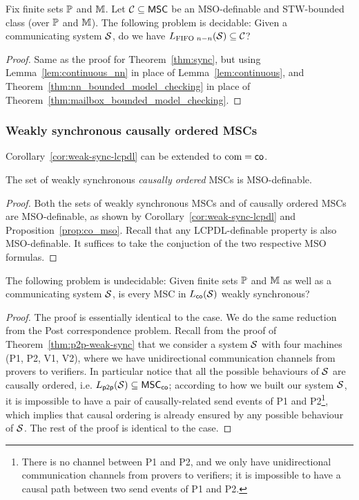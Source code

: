 \begin{theorem}\label{thm:sync_nn}
	Fix finite sets $\mathbb{P}$ and $\mathbb{M}$.
	Let $\mathcal{C} \subseteq \mathsf{MSC}$ be an MSO-definable and STW-bounded class (over $\mathbb{P}$ and $\mathbb{M}$).
	The following problem is decidable:
	Given a communicating system $\mathcal{S}$, do we have $L_{\text{FIFO } n\mathsf{-}n}(\mathcal{S}) \subseteq \mathcal{C}$?
	\end{theorem}
\begin{proof}
Same as the proof for Theorem~\ref{thm:sync}, but using Lemma~\ref{lem:continuous_nn} in place of Lemma~\ref{lem:continuous}, and Theorem~\ref{thm:nn_bounded_model_checking} in place of Theorem~\ref{thm:mailbox_bounded_model_checking}.
\end{proof}

\subsubsection{Weakly synchronous causally ordered MSCs}

Corollary~\ref{cor:weak-sync-lcpdl} can  be extended to $\textup{com} = \mathsf{co}$. 

\begin{proposition}\label{cor:co-weak-sync-mso}
The set of weakly synchronous \emph{causally ordered} MSCs is MSO-definable.
\end{proposition}
\begin{proof}
Both the sets of weakly synchronous MSCs and of causally ordered MSCs are MSO-definable, as shown by Corollary~\ref{cor:weak-sync-lcpdl} and Proposition~\ref{prop:co_mso}. Recall that any LCPDL-definable property is also MSO-definable. It suffices to take the conjuction of the two respective MSO formulas.
\end{proof}

\begin{theorem}\label{thm:co-weak-sync}
The following problem is undecidable:
Given finite sets $\mathbb{P}$ and $\mathbb{M}$ as well as a communicating system $\mathcal{S}$,
is every MSC in $L_{\mathsf{co}}(\mathcal{S})$ weakly synchronous?
\end{theorem}
\begin{proof}
The proof is essentially identical to the \pp case. We do the same reduction from the Post correspondence problem. Recall from the proof of Theorem~\ref{thm:p2p-weak-sync} that we consider a system $\mathcal{S}$ with four machines (P1, P2, V1, V2), where we have unidirectional communication channels from provers to verifiers. In particular notice that all the possible behaviours of $\mathcal{S}$ are causally ordered, i.e. $L_{\mathsf{p2p}}(\mathcal{S}) \subseteq \mathsf{MSC}_{\mathsf{co}}$; according to how we built our system $\mathcal{S}$, it is impossible to have a pair of causally-related send events of P1 and P2\footnote{There is no channel between P1 and P2, and we only have unidirectional communication channels from provers to verifiers; it is impossible to have a causal path between two send events of P1 and P2.}, which implies that causal ordering is already ensured by any possible \pp behaviour of $\mathcal{S}$. The rest of the proof is identical to the \pp case.
\end{proof}

